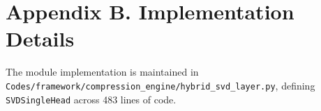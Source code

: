 \section*{Appendix B. Implementation Details}
The module implementation is maintained in \texttt{Codes/framework/compression\_engine/hybrid\_svd\_layer.py}, defining \texttt{SVDSingleHead} across 483 lines of code.
